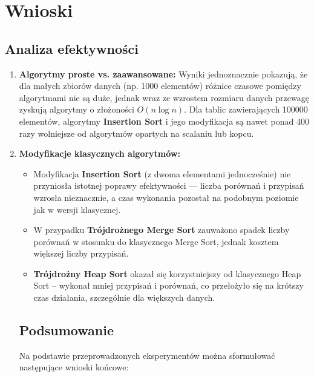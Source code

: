 \documentclass[12pt,a4paper]{article}
\begin{document}
\section{Wnioski}

\subsection{Analiza efektywności}

\begin{enumerate}
\item \textbf{Algorytmy proste vs. zaawansowane:}  
Wyniki jednoznacznie pokazują, że dla małych zbiorów danych (np. 1000 elementów) różnice czasowe pomiędzy algorytmami nie są duże, jednak wraz ze wzrostem rozmiaru danych przewagę zyskują algorytmy o złożoności $O(n \log n)$.  
Dla tablic zawierających 100000 elementów, algorytmy \textbf{Insertion Sort} i jego modyfikacja są nawet ponad 400 razy wolniejsze od algorytmów opartych na scalaniu lub kopcu.

\item \textbf{Modyfikacje klasycznych algorytmów:}
\begin{itemize}
\item Modyfikacja \textbf{Insertion Sort} (z dwoma elementami jednocześnie) nie przyniosła istotnej poprawy efektywności — liczba porównań i przypisań wzrosła nieznacznie, a czas wykonania pozostał na podobnym poziomie jak w wersji klasycznej.
\item W przypadku \textbf{Trójdrożnego Merge Sort} zauważono spadek liczby porównań w stosunku do klasycznego Merge Sort, jednak kosztem większej liczby przypisań.
\item \textbf{Trójdrożny Heap Sort} okazał się korzystniejszy od klasycznego Heap Sort – wykonał mniej przypisań i porównań, co przełożyło się na krótszy czas działania, szczególnie dla większych danych.
\end{itemize}

\subsection{Podsumowanie}

Na podstawie przeprowadzonych eksperymentów można sformułować następujące wnioski końcowe:


\end{enumerate}
\end{document}
